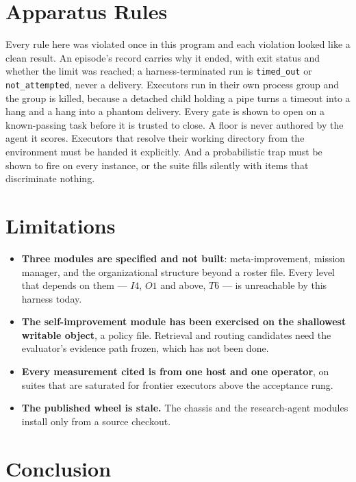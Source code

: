 \documentclass[11pt]{article}
\theoremstyle{definition}
\begin{document}
\section{Apparatus Rules}\label{sec:apparatus}

Every rule here was violated once in this program and each violation looked like a clean result. An episode's record carries why it ended, with exit status and whether the limit was reached; a harness-terminated run is \texttt{timed\_out} or \texttt{not\_attempted}, never a delivery. Executors run in their own process group and the group is killed, because a detached child holding a pipe turns a timeout into a hang and a hang into a phantom delivery. Every gate is shown to open on a known-passing task before it is trusted to close. A floor is never authored by the agent it scores. Executors that resolve their working directory from the environment must be handed it explicitly. And a probabilistic trap must be shown to fire on every instance, or the suite fills silently with items that discriminate nothing.

\section{Limitations}\label{sec:limits}

\begin{itemize}[leftmargin=*]
\item \textbf{Three modules are specified and not built}: meta-improvement, mission manager, and the organizational structure beyond a roster file. Every level that depends on them --- $I4$, $O1$ and above, $T6$ --- is unreachable by this harness today.
\item \textbf{The self-improvement module has been exercised on the shallowest writable object}, a policy file. Retrieval and routing candidates need the evaluator's evidence path frozen, which has not been done.
\item \textbf{Every measurement cited is from one host and one operator}, on suites that are saturated for frontier executors above the acceptance rung.
\item \textbf{The published wheel is stale.} The chassis and the research-agent modules install only from a source checkout.
\end{itemize}

\section{Conclusion}
\end{document}
